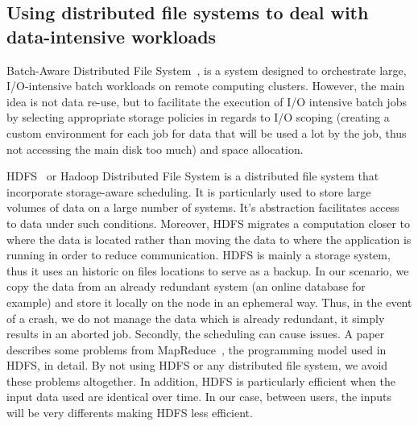 \documentclass[conference,10pt]{IEEEtran}
\begin{document}
\subsection{Using distributed file systems to deal with data-intensive workloads}

Batch-Aware Distributed File System~\cite{Explicit_Control_in_a_Batch-Aware_Distributed_File_System},
is a system designed to orchestrate large, I/O-intensive batch workloads on remote computing clusters.
However, the main idea is not data re-use, but to
facilitate the execution of I/O intensive batch
jobs by selecting appropriate storage policies
in regards to I/O scoping (creating a custom environment for each job
for data that will be used a lot by the job, thus not accessing the main disk too
much) and space allocation.

HDFS~\cite{hdfs} or Hadoop Distributed File System is a distributed file system that
incorporate storage-aware scheduling. It is particularly used to store large
volumes of data on a large number of systems. It's abstraction facilitates access to data
under such conditions. Moreover, HDFS migrates a computation closer to where the data is
located rather than moving the data to where the application is running in order to reduce communication.
HDFS is mainly a storage system, thus it uses an historic on files locations to serve as a backup. 
In our scenario, we copy the data from an already redundant system (an online database for example)
and store it locally on the node in an ephemeral way.
Thus, in the event of a crash, we do not manage the data which is already redundant, it simply results in an aborted job.
Secondly, the scheduling can cause issues. A paper describes  some problems from
MapReduce~\cite{issue_with_hdfs}, the programming model used in HDFS, in detail.
By not using HDFS or any distributed file system, we avoid  these problems altogether. 
In addition, HDFS is particularly efficient when the input data used are identical over time.
In our case, between users, the inputs will be very differents making HDFS less efficient.
\end{document}
